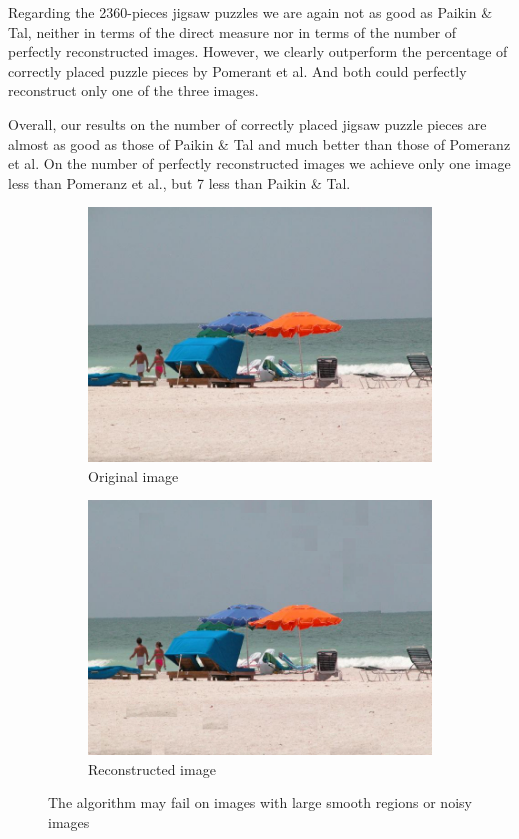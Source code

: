 \documentclass[11pt]{report}
\begin{document}
Regarding the 2360-pieces jigsaw puzzles we are again not as good as Paikin \&
Tal, neither in terms of the direct measure nor in terms of the number of
perfectly reconstructed images. However, we clearly outperform the percentage of
correctly placed puzzle pieces by Pomerant et al. And both could perfectly
reconstruct only one of the three images.

Overall, our results on the number of correctly placed jigsaw puzzle pieces are
almost as good as those of Paikin \& Tal and much better than those of Pomeranz
et al. On the number of perfectly reconstructed images we achieve only one image
less than Pomeranz et al., but 7 less than Paikin \& Tal.
\begin{figure}
  \centering
  \begin{subfigure}{0.45\textwidth}
    \includegraphics[width=\textwidth]{../imData/540/8.jpg}
		\caption{Original image}
		\label{img:540_8}
	\end{subfigure}
  \begin{subfigure}{0.45\textwidth}
  \includegraphics[width=\textwidth]{8_solved.png}
		\caption{Reconstructed image}
		\label{img:540_8_reconstructed}
	\end{subfigure}
  \caption{The algorithm may fail on images with large smooth regions or noisy images}
  \label{fig:fail}
\end{figure}
\end{document}
